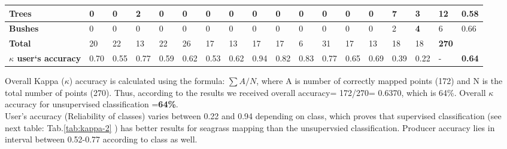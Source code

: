 \documentclass[11pt]{article}
\begin{document}
\begin{appendices}
\begin{table}[H]
\begin{tabular}{| p{1.7cm} | p{0.4cm}| p{0.4cm}|p{0.4cm}|p{0.4cm}|p{0.4cm}|p{0.4cm}|p{0.4cm}|p{0.4cm}|p{0.4cm}|p{0.4cm}|p{0.4cm}|p{0.4cm}|p{0.4cm}| p{0.4cm}| p{0.4cm}|| p{0.4cm}| p{0.4cm}|}
		\textbf{Trees} & 0 & 0 & 2 & 0 & 0 & 0 & 0 & 0 & 0 & 0 & 0 & 0 & 0 & \cellcolor{GreenYellow}\textbf{7} & 3 & \cellcolor{LightGoldenrodYellow}12 & 0.58 \\ \hline
		\textbf{Bushes} & 0 & 0 & 0 & 0 & 0 & 0 & 0 & 0 & 0 & 0 & 0 & 0 & 0 & 2 & \cellcolor{GreenYellow}\textbf{4}& \cellcolor{LightGoldenrodYellow}6 & 0.66 \\ \hline	\hline	
		\rowcolor{LightGoldenrodYellow}\textbf{Total} & 20 & 22 & 13 & 22 & 26 & 17 & 13 & 17 & 17 & 6 & 31 & 17 & 13 & 18 & 18 & \cellcolor{LightGoldenrodYellow}\textbf{270} & \\ \hline
		\textbf{$\kappa$ user`s accuracy} & 0.70 & 0.55 & 0.77 & 0.59 & 0.62 & 0.53 & 0.62 & 0.94 & 0.82 & 0.83 & 0.77 & 0.65 & 0.69 & 0.39 & 0.22 & - & \cellcolor{Chartreuse}\textbf{0.64} \\ \hline
	\end{tabular}	
\end{table}
\normalsize
Overall Kappa ($\kappa$) accuracy is calculated using the formula:  $\sum{A/N}$, where A is number of correctly mapped points (172) and N is the total number of points (270). Thus, according to the results we received overall accuracy= 172/270= 0.6370, which is 64\%.  Overall $\kappa$ accuracy for unsupervised classification =\textbf{64\%}. \\ 
 User’s accuracy (Reliability of classes) varies between 0.22 and 0.94 depending on class, which proves that supervised classification (see next table: Tab.\ref{tab:kappa-2} ) has better results for seagrass mapping than the unsupervsied classification. 
Producer accuracy lies in interval between 0.52-0.77 according to class as well. 
\pagebreak


\end{appendices}
\end{document}
